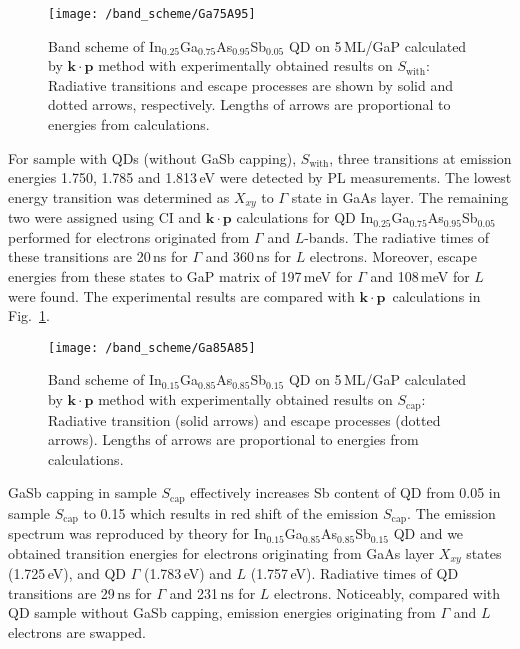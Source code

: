 \begin{figure}
	\centering
	\texttt{[image: /band\_scheme/Ga75A95]}%
	\caption{Band scheme of In$_{0.25}$Ga$_{0.75}$As$_{0.95}$Sb$_{0.05}$ QD on 5$\,$ML/GaP calculated by $\mathbf{k \cdot p}$ method with experimentally obtained results on $S_\mathrm{with}$: Radiative transitions and escape processes are shown by solid and dotted arrows, respectively. Lengths of arrows are proportional to energies from calculations.
	}
	\label{fig:Band_scheme_with}
\end{figure}
%
For sample with QDs (without GaSb capping), $S_\mathrm{with}$, three transitions at emission energies 1.750, 1.785 and 1.813$\,$eV were detected by PL measurements. The lowest energy transition was determined as $X_{xy}$ to $\Gamma$ state in GaAs layer. The remaining two were assigned using CI and $\mathbf{k \cdot p}$ calculations for QD In$_{0.25}$Ga$_{0.75}$As$_{0.95}$Sb$_{0.05}$ performed for electrons originated from $\Gamma$ and $L$-bands. The radiative times of these transitions are 20$\,$ns for $\Gamma$ and 360$\,$ns for $L$ electrons. Moreover, escape energies from these states to GaP matrix of 197$\,$meV for $\Gamma$ and 108$\,$meV for $L$ were found. The experimental results are compared with $\mathbf{k \cdot p}$~calculations in Fig.~\ref{fig:Band_scheme_with}.
%


\begin{figure}
	\centering
	\texttt{[image: /band\_scheme/Ga85A85]}%
	\caption{Band scheme of In$_{0.15}$Ga$_{0.85}$As$_{0.85}$Sb$_{0.15}$ QD on 5$\,$ML/GaP calculated by $\mathbf{k \cdot p}$ method with experimentally obtained results on $S_\mathrm{cap}$: Radiative transition (solid arrows) and escape processes (dotted arrows). Lengths of arrows are proportional to energies from calculations.}
	\label{fig:Band_scheme_cap}
\end{figure}
%
GaSb capping in sample $S_\mathrm{cap}$ effectively increases Sb content of QD from 0.05 in sample $S_\mathrm{cap}$ to 0.15 which results in red shift of the emission $S_\mathrm{cap}$. The emission spectrum was reproduced by theory for In$_{0.15}$Ga$_{0.85}$As$_{0.85}$Sb$_{0.15}$ QD and we obtained transition energies for electrons originating from GaAs layer $X_{xy}$ states (1.725$\,$eV), and QD $\Gamma$ (1.783$\,$eV) and $L$ (1.757$\,$eV). Radiative times of QD transitions are 29$\,$ns for $\Gamma$ and 231$\,$ns for $L$ electrons. Noticeably, compared with QD sample without GaSb capping, emission energies originating from $\Gamma$ and $L$ electrons are swapped.


